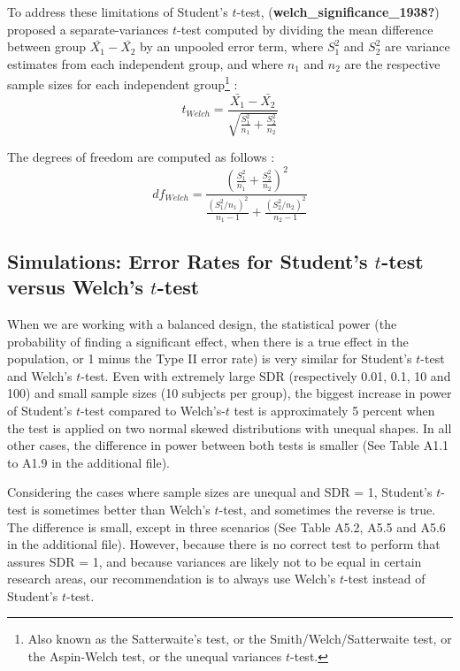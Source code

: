 \documentclass[
  english,
  man]{apa6}
\begin{document}
To address these limitations of Student's \(t\)-test, (\textbf{welch\_significance\_1938?}) proposed a separate-variances \(t\)-test computed by dividing the mean difference between group \(\bar{X_1}-\bar{X_2}\) by an unpooled error term, where \(S^2_1\) and \(S^2_2\) are variance estimates from each independent group, and where \(n_1\) and \(n_2\) are the respective sample sizes for each independent group\footnote{Also known as the Satterwaite’s test, or the Smith/Welch/Satterwaite test, or the Aspin-Welch test, or the unequal variances $t$-test.} :
\begin{equation*} 
t_{Welch}=\frac{\bar{X_1}-\bar{X_2}}{\sqrt{\frac{S^2_1}{n_1}+\frac{S^2_2}{n_2}}}
\label{eqn:Welch}
\end{equation*}

The degrees of freedom are computed as follows :
\begin{equation*} 
df_{Welch} = \frac{\left(\frac{S^2_1}{n_1}+\frac{S^2_2}{n_2} \right)^2}{\frac{(S^2_1/n_1)^2}{n_1-1}+\frac{(S^2_2/n_2)^2}{n_2-1}}
\label{eqn:dfWelch}
\end{equation*}

\hypertarget{simulations-error-rates-for-students-t-test-versus-welchs-t-test}{%
\subsection{\texorpdfstring{Simulations: Error Rates for Student's \(t\)-test versus Welch's \(t\)-test}{Simulations: Error Rates for Student's t-test versus Welch's t-test}}\label{simulations-error-rates-for-students-t-test-versus-welchs-t-test}}

When we are working with a balanced design, the statistical power (the probability of finding a significant effect, when there is a true effect in the population, or 1 minus the Type II error rate) is very similar for Student's \(t\)-test and Welch's \(t\)-test. Even with extremely large SDR (respectively 0.01, 0.1, 10 and 100) and small sample sizes (10 subjects per group), the biggest increase in power of Student's \(t\)-test compared to Welch's-\(t\) test is approximately 5 percent when the test is applied on two normal skewed distributions with unequal shapes. In all other cases, the difference in power between both tests is smaller (See Table A1.1 to A1.9 in the additional file).

Considering the cases where sample sizes are unequal and SDR = 1, Student's \(t\)-test is sometimes better than Welch's \(t\)-test, and sometimes the reverse is true. The difference is small, except in three scenarios (See Table A5.2, A5.5 and A5.6 in the additional file). However, because there is no correct test to perform that assures SDR = 1, and because variances are likely not to be equal in certain research areas, our recommendation is to always use Welch's \(t\)-test instead of Student's \(t\)-test.
\end{document}
